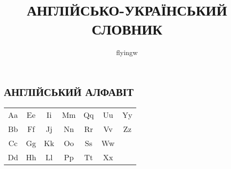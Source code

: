 


\title{\uppercase{Англійсько-український\\словник}}
\author{flyingw}
\maketitle

\thispagestyle{empty}
\clearpage

\begin{center}
\section{\uppercase{Англійський алфавіт}}
\begin{tabular}{| c c c c c c c |}
  \hline
  Aa & Ee & Ii & Mm & Qq & Uu & Yy \\
  Bb & Ff & Jj & Nn & Rr & Vv & Zz \\
  Cc & Gg & Kk & Oo & Ss & Ww &    \\
  Dd & Hh & Ll & Pp & Tt & Xx &    \\
  \hline
\end{tabular}
\end{center}

\thispagestyle{empty}
\clearpage

